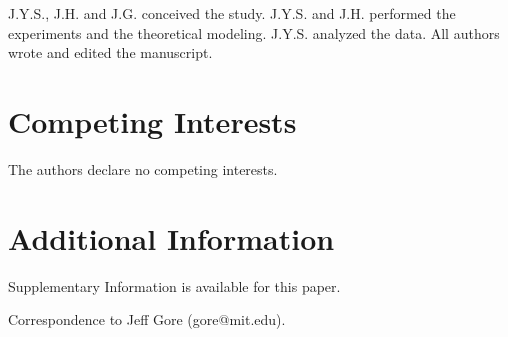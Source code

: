 J.Y.S., J.H. and J.G. conceived the study. J.Y.S. and J.H. performed the experiments and the theoretical modeling. J.Y.S. analyzed the data. All authors wrote and edited the manuscript.


\section*{Competing Interests}
\label{sec:competing}

The authors declare no competing interests.


\section*{Additional Information}
\label{sec:additional}

Supplementary Information is available for this paper.

\noindent Correspondence to Jeff Gore (gore@mit.edu).
